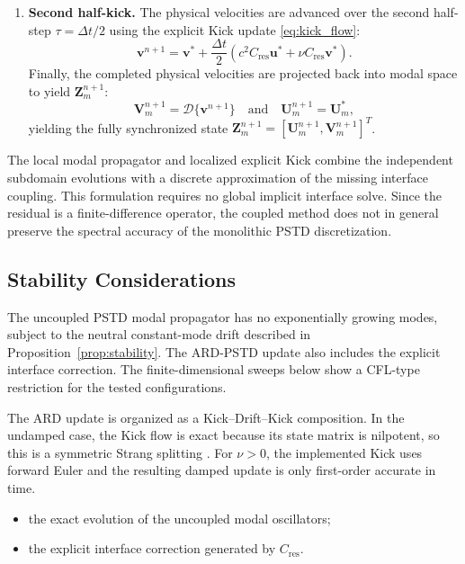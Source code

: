 \documentclass{Configuration_Files/PoliMi3i_thesis}
\begin{document}
\begin{enumerate}
\item
\textbf{Second half-kick.}
The physical velocities are advanced over the second half-step $\tau = \Delta t/2$ using the explicit Kick update \eqref{eq:kick_flow}:
\begin{equation*}
    \mathbf{v}^{n+1} = \mathbf{v}^* + \frac{\Delta t}{2} \left( c^2 C_{\mathrm{res}} \mathbf{u}^* + \nu C_{\mathrm{res}} \mathbf{v}^* \right).
\end{equation*}
Finally, the completed physical velocities are projected back into modal space to yield $\mathbf Z_m^{n+1}$:
\begin{equation*}
    \mathbf{V}_m^{n+1} = \mathcal{D} \{ \mathbf{v}^{n+1} \} \quad \text{and} \quad \mathbf{U}_m^{n+1} = \mathbf{U}_m^*,
\end{equation*}
yielding the fully synchronized state $\mathbf{Z}_m^{n+1} = [\mathbf{U}_m^{n+1}, \mathbf{V}_m^{n+1}]^T$.

\end{enumerate}

The local modal propagator and localized explicit Kick combine the independent subdomain evolutions with a discrete approximation of the missing interface coupling. This formulation requires no global implicit interface solve. Since the residual is a finite-difference operator, the coupled method does not in general preserve the spectral accuracy of the monolithic PSTD discretization.

\subsection{Stability Considerations}

The uncoupled PSTD modal propagator has no exponentially growing modes, subject to the neutral constant-mode drift described in Proposition~\ref{prop:stability}. The ARD-PSTD update also includes the explicit interface correction. The finite-dimensional sweeps below show a CFL-type restriction for the tested configurations.

The ARD update is organized as a Kick--Drift--Kick composition. In the
undamped case, the Kick flow is exact because its state matrix is nilpotent,
so this is a symmetric Strang splitting \citep{strang_construction_1968}.
For $\nu>0$, the implemented Kick uses forward Euler and the resulting
damped update is only first-order accurate in time.

\begin{itemize}
    \item the exact evolution of the uncoupled modal oscillators;
    \item the explicit interface correction generated by $C_{\mathrm{res}}$.
\end{itemize}
\end{document}
